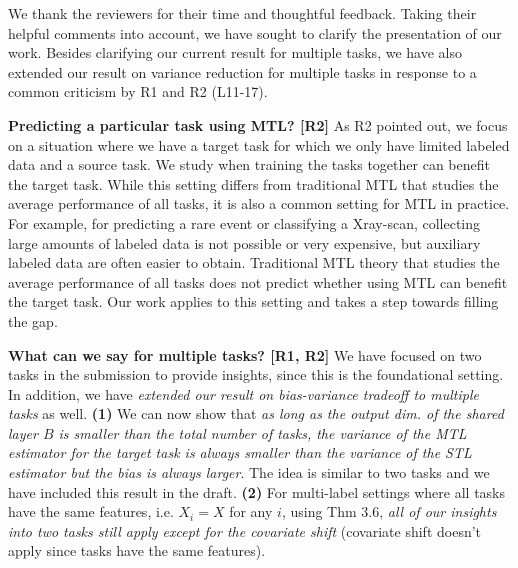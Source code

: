 \documentclass{article}
\begin{document}
We thank the reviewers for their time and thoughtful feedback.
Taking their helpful comments into account, we have sought to clarify the presentation of our work. %
Besides clarifying our current result for multiple tasks, we have also extended our result on variance reduction for multiple tasks in response to a common criticism by R1 and R2 (L11-17).


\vspace{-0.02in}
\textbf{Predicting a particular task using MTL? [R2]}
As R2 pointed out, we focus on a situation where we have a target task for which we only have limited labeled data and a source task.
We study when training the tasks together can benefit the target task.
While this setting differs from traditional MTL that studies the average performance of all tasks, it is also a common setting for MTL in practice.
For example, for predicting a rare event or classifying a Xray-scan, collecting large amounts of labeled data is not possible or very expensive, but auxiliary labeled data are often easier to obtain.
Traditional MTL theory that studies the average performance of all tasks does not predict whether using MTL can benefit the target task.
Our work applies to this setting and takes a step towards filling the gap.


\vspace{-0.025in}
\textbf{What can we say for multiple tasks? [R1, R2]}
We have focused on two tasks in the submission to provide insights, since this is the foundational setting.
In addition, we have \textit{extended our result on bias-variance tradeoff to multiple tasks} as well.
\textbf{(1)} We can now show that \textit{as long as the output dim. of the shared layer $B$ is smaller than the total number of tasks, the variance of the MTL estimator for the target task is always smaller than the variance of the STL estimator but the bias is always larger}.
The idea is similar to two tasks and we have included this result in the draft.
\textbf{(2)} For multi-label settings where all tasks have the same features, i.e. $X_i = X$ for any $i$, using Thm 3.6, \textit{all of our insights into two tasks still apply except for the covariate shift} (covariate shift doesn't apply since tasks have the same features).
\end{document}
